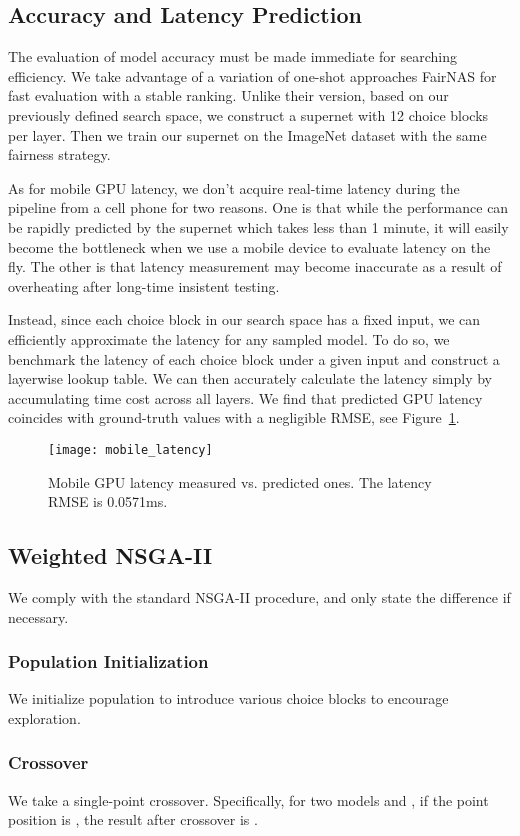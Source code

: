 \documentclass[letterpaper]{article} \usepackage{aaai20}  \usepackage{times}  \usepackage{helvet} \usepackage{courier}  \usepackage[hyphens]{url}  \usepackage{graphicx} \urlstyle{rm} \def\UrlFont{\rm}  \usepackage{graphicx}  \usepackage{amsmath}
\begin{document}
\subsection{Accuracy and Latency Prediction}
\label{sec:acc}
The evaluation of model accuracy must be made immediate for searching efficiency. We take advantage of a variation of one-shot approaches FairNAS for fast evaluation with a stable ranking. Unlike their version, based on our previously defined search space, we construct a supernet with 12 choice blocks per layer. Then we train our supernet on the ImageNet dataset with the same fairness strategy. 

As for mobile GPU latency, we don't acquire real-time latency during the pipeline from a cell phone for two reasons. One is that while the performance can be rapidly predicted by the supernet which takes less than 1 minute, it will easily become the bottleneck when we use a mobile device to evaluate latency on the fly. The other is that latency measurement may become inaccurate as a result of overheating after long-time insistent testing.

Instead, since each choice block in our search space has a fixed input, we can efficiently approximate the latency for any sampled model. To do so, we benchmark the latency of each choice block under a given input and construct a layerwise lookup table. We can then accurately calculate the latency simply by accumulating time cost across all layers. We find that predicted GPU latency coincides with ground-truth values with a negligible RMSE, see Figure~\ref{fig:mobile-latency}.

\begin{figure}[ht]
\centering
{
\texttt{[image: mobile\_latency]}
}
\caption{Mobile GPU latency measured vs. predicted ones. The latency RMSE is 0.0571ms. }
\label{fig:mobile-latency}
\end{figure}

\subsection{Weighted NSGA-II}
We comply with the standard NSGA-II procedure, and only state the difference if necessary.
\subsubsection{Population Initialization}
We initialize population to introduce various choice blocks to encourage exploration.
\subsubsection{Crossover}
We take a single-point crossover. Specifically, for two models   and , if the point position is , the result after crossover is
 .
\end{document}
